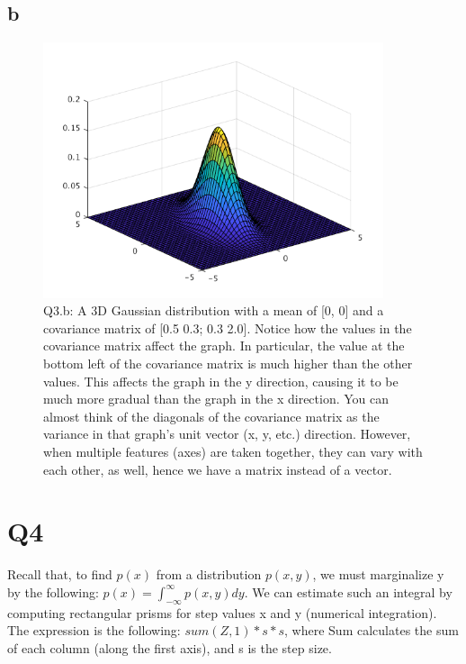 \documentclass{article}
\begin{document}
\subsection{b}

\begin{figure}[!ht]
	\centering
	\includegraphics[width=100mm]{3d-gaussian.png}
	\caption{Q3.b: A 3D Gaussian distribution with a mean of [0, 0] and a covariance 
matrix of [0.5 0.3; 0.3 2.0]. Notice how the values in the covariance matrix 
affect the graph. In particular, the value at the bottom left of the covariance 
matrix is much higher than the other values. This affects the graph in the y 
direction, causing it to be much more gradual than the graph in the x 
direction. You can almost think of the diagonals of the covariance 
matrix as the variance in that graph's unit vector (x, y, etc.) 
direction. However, when multiple features (axes) are taken together, they can 
vary with each other, as well, hence we have a matrix instead of a vector.}
\end{figure}

\section{Q4}

Recall that, to find $ p(x) $ from a distribution $ p(x, y) $, we must 
marginalize y by the following: $ p(x) = \int_{-\infty}^{\infty} p(x, y) dy $. 
We can estimate such an integral by computing rectangular prisms for step 
values x and y (numerical integration). The expression is the following: 
$ sum(Z, 1) * s * s $, where Sum calculates the sum of each column (along 
the first axis), and s is the step size.
\end{document}
